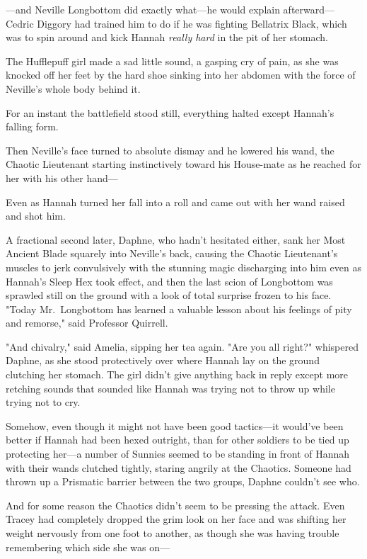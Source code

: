 ---and Neville Longbottom did exactly what---he would explain 
afterward---Cedric Diggory had trained him to do if he was fighting Bellatrix 
Black, which was to spin around and kick Hannah \emph{really hard} in the pit 
of her stomach.

The Hufflepuff girl made a sad little sound, a gasping cry of pain, as she was 
knocked off her feet by the hard shoe sinking into her abdomen with the force 
of Neville's whole body behind it.

For an instant the battlefield stood still, everything halted except Hannah's 
falling form.

Then Neville's face turned to absolute dismay and he lowered his wand, the 
Chaotic Lieutenant starting instinctively toward his House-mate as he reached 
for her with his other hand---

Even as Hannah turned her fall into a roll and came out with her wand raised 
and shot him.

A fractional second later, Daphne, who hadn't hesitated either, sank her Most 
Ancient Blade squarely into Neville's back, causing the Chaotic Lieutenant's 
muscles to jerk convulsively with the stunning magic discharging into him even 
as Hannah's Sleep Hex took effect, and then the last scion of Longbottom was 
sprawled still on the ground with a look of total surprise frozen to his face.
\sbreak
"Today Mr.~Longbottom has learned a valuable lesson about his feelings of pity 
and remorse," said Professor Quirrell.

"And chivalry," said Amelia, sipping her tea again.
\sbreak
"Are you all right?" whispered Daphne, as she stood protectively over where 
Hannah lay on the ground clutching her stomach. The girl didn't give anything 
back in reply except more retching sounds that sounded like Hannah was trying 
not to throw up while trying not to cry.

Somehow, even though it might not have been good tactics---it would've been 
better if Hannah had been hexed outright, than for other soldiers to be tied up 
protecting her---a number of Sunnies seemed to be standing in front of Hannah 
with their wands clutched tightly, staring angrily at the Chaotics. Someone had 
thrown up a Prismatic barrier between the two groups, Daphne couldn't see who.

And for some reason the Chaotics didn't seem to be pressing the attack. Even 
Tracey had completely dropped the grim look on her face and was shifting her 
weight nervously from one foot to another, as though she was having trouble 
remembering which side she was on---

